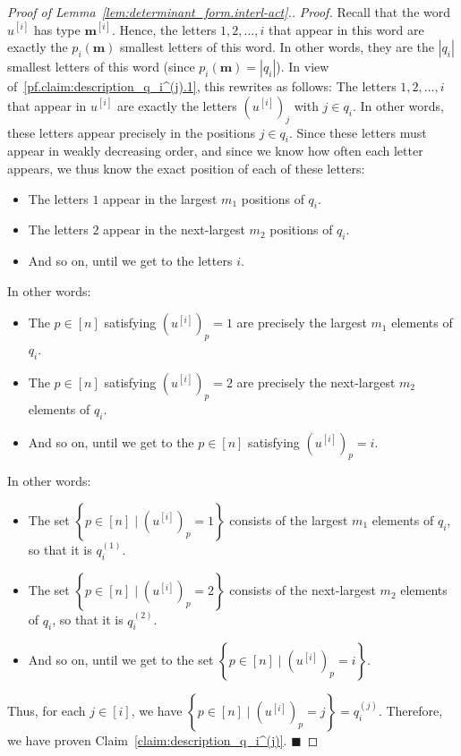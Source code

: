 \documentclass[reqno]{amsart}
\newcommand{\0}{\phantom{c}}
\newcommand{\mm}{\mathbf{m}}
\newenvironment{subproof}{\textit{Proof.} }{\hfill$\blacksquare$ \medskip}
\newenvironment{verlong}{}{}
\newcommand{\set}[1]{\left\{ #1 \right\}}
\newcommand{\abs}[1]{\left| #1 \right|}
\newcommand{\ive}[1]{\left[ #1 \right]}
\theoremstyle{plain}
\theoremstyle{definition}
\numberwithin{equation}{section}
\begin{document}
\begin{proof}[Proof of Lemma~\ref{lem:determinant_form.interl-act}.]
\begin{subproof}
Recall that the word $u^{\left[  i\right]  }$ has type $\mm^{[i]}$.
Hence, the letters $1,2,\dotsc,i$ that appear in this word are exactly the $p_i(\mm)$ smallest letters of this word.
In other words, they are the $\abs{q_i}$ smallest letters of this word (since $p_i(\mm) = \abs{q_i}$).
In view of~\eqref{pf.claim:description_q_i^(j).1}, this rewrites as follows:
The letters $1,2,\dotsc,i$ that appear in $u^{\left[  i\right]  }$ are exactly the letters $(u^{\left[  i\right]})_j$ with $j \in q_i$.
In other words, these letters appear precisely in the positions $j \in q_i$.
Since these letters must appear in weakly decreasing order, and since we know how often each letter appears, we thus know the exact position of each of these letters:
\begin{itemize}
\item The letters $1$ appear in the largest $m_1$ positions of $q_i$.
\item The letters $2$ appear in the next-largest $m_2$ positions of $q_i$.
\item And so on, until we get to the letters $i$.
\end{itemize}
\begin{verlong}
In other words:
\begin{itemize}
\item The $p \in \ive{n}$ satisfying $( u^{\left[  i\right] } )_p = 1$ are precisely the largest $m_1$ elements of $q_i$.
\item The $p \in \ive{n}$ satisfying $( u^{\left[  i\right] } )_p = 2$ are precisely the next-largest $m_2$ elements of $q_i$.
\item And so on, until we get to the $p \in \ive{n}$ satisfying $(u^{\left[  i\right]})_p = i$.
\end{itemize}
\end{verlong}
In other words:
\begin{itemize}
\item The set $\set{ p \in \ive{n} \mid ( u^{\left[  i\right] } )_p = 1 }$ consists of the largest $m_1$ elements of $q_i$, so that it is $q_i^{(1)}$.
\item The set $\set{ p \in \ive{n} \mid ( u^{\left[  i\right] } )_p = 2 }$ consists of the next-largest $m_2$ elements of $q_i$, so that it is $q_i^{(2)}$.
\item And so on, until we get to the set $\set{ p \in \ive{n} \mid ( u^{\left[  i\right] } )_p = i }$.
\end{itemize}
Thus, for each $j \in \ive{i}$, we have
$\set{ p \in \ive{n} \mid ( u^{\left[  i\right] } )_p = j } = q_i^{(j)}$.
Therefore, we have proven Claim~\ref{claim:description_q_i^(j)}.
\end{subproof}


\end{proof}
\end{document}
